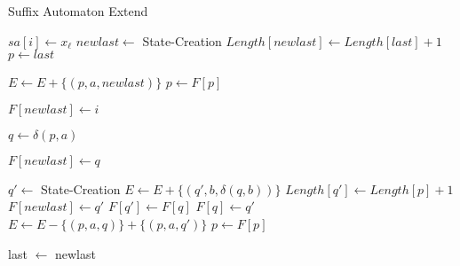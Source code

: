 \begin{alg}
	Suffix Automaton Extend
	\label{alg:sa_extend}
	\begin{algorithmic}[1]
		
			\State $sa[i] \leftarrow x_\ell$
			\State $newlast \leftarrow$ State-Creation
			\State $Length[newlast] \leftarrow Length[last]+1$
			\State $p \leftarrow last$

				\State  $E \leftarrow E + \{(p, a, newlast)\}$
				\State  $p \leftarrow F[p]$
			\EndWhile

				\State $F[newlast] \leftarrow i$
			
			\Else
				\State $q \leftarrow \delta(p, a)$
				
					\State $F[newlast] \leftarrow q$
				
				\Else
					\State $q' \leftarrow$ State-Creation
						\State  $E \leftarrow E + \{(q', b, \delta(q, b))\}$
					\EndFor
					\State $Length[q'] \leftarrow Length[p]+1$
					\State $F[newlast] \leftarrow q'$
					\State $F[q'] \leftarrow F[q]$
					\State $F[q] \leftarrow q'$
						\State  $E \leftarrow E - \{(p, a, q)\} + \{(p, a, q')\}$
						\State  $p \leftarrow F[p]$
					\EndWhile
				\EndIf

			\EndIf
			
			\State last $\leftarrow$ newlast
				
		\EndFunction
				
	\end{algorithmic}
\end{alg}